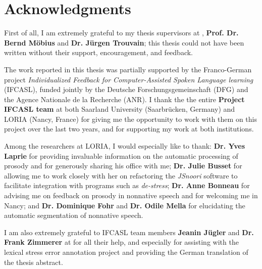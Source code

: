 %
\chapter*{Acknowledgments}
\label{sec:thanks}
\vspace*{-10mm}


First of all, I am extremely grateful to my thesis supervisors at {\thesisUniversity}, \textbf{Prof. Dr. Bernd Möbius} and \textbf{Dr. Jürgen Trouvain}; this thesis could not have been written without their support, encouragement, and feedback.

The work reported in this thesis was partially supported by the Franco-German project \textit{Individualized Feedback for Computer-Assisted Spoken Language learning} (IFCASL), funded jointly by the Deutsche Forschungsgemeinschaft (DFG) and the Agence Nationale de la Recherche (ANR). I thank the the entire \textbf{Project IFCASL team} at both Saarland University (Saarbrücken, Germany) and LORIA (Nancy, France) for giving me the opportunity to work with them on this project over the last two years, and for supporting my work at both institutions.

Among the researchers at LORIA, I would especially like to thank:
\textbf{Dr. Yves Laprie} for providing invaluable information on the automatic processing of prosody and for generously sharing his office with me;
\textbf{Dr. Julie Busset} for allowing me to work closely with her on refactoring the \textit{JSnoori} software to facilitate integration with programs such as \textit{de-stress};
\textbf{Dr. Anne Bonneau} for advising me on feedback on prosody in nonnative speech and for welcoming me in Nancy;
and 
\textbf{Dr. Dominique Fohr} and \textbf{Dr. Odile Mella} for elucidating the automatic segmentation of nonnative speech. 

I am also extremely grateful to IFCASL team members \textbf{Jeanin Jügler} and \textbf{Dr. Frank Zimmerer} at {\thesisUniversity} for all their help, and especially for assisting with the lexical stress error annotation project and providing the German translation of the thesis abstract. 

